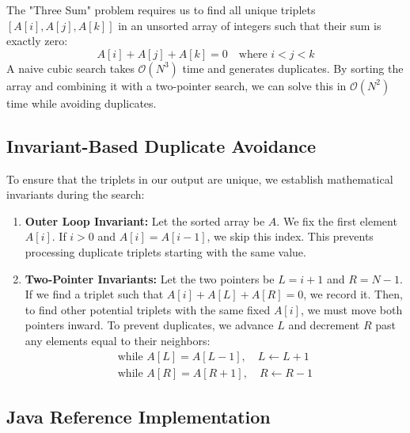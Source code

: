 \documentclass[10pt,journal,compsoc,onecolumn]{IEEEtran}
\begin{document}
The "Three Sum" problem requires us to find all unique triplets $[A[i], A[j], A[k]]$ in an unsorted array of integers such that their sum is exactly zero:
\begin{equation}
A[i] + A[j] + A[k] = 0 \quad \text{where } i < j < k
\end{equation}
A naive cubic search takes $\mathcal{O}(N^3)$ time and generates duplicates. By sorting the array and combining it with a two-pointer search, we can solve this in $\mathcal{O}(N^2)$ time while avoiding duplicates.

\subsection{Invariant-Based Duplicate Avoidance}

To ensure that the triplets in our output are unique, we establish mathematical invariants during the search:
\begin{enumerate}
    \item \textbf{Outer Loop Invariant:} Let the sorted array be $A$. We fix the first element $A[i]$. If $i > 0$ and $A[i] = A[i-1]$, we skip this index. This prevents processing duplicate triplets starting with the same value.
    \item \textbf{Two-Pointer Invariants:} Let the two pointers be $L = i+1$ and $R = N-1$. If we find a triplet such that $A[i] + A[L] + A[R] = 0$, we record it. Then, to find other potential triplets with the same fixed $A[i]$, we must move both pointers inward. To prevent duplicates, we advance $L$ and decrement $R$ past any elements equal to their neighbors:
    \begin{align}
    \text{while } A[L] = A[L-1], \quad L \leftarrow L+1 \\
    \text{while } A[R] = A[R+1], \quad R \leftarrow R-1
    \end{align}
\end{enumerate}

\subsection{Java Reference Implementation}
\end{document}
